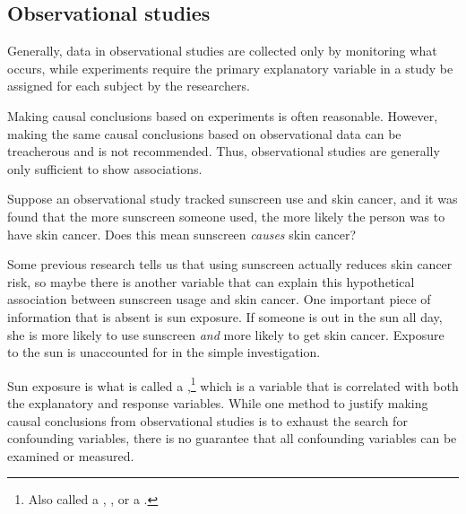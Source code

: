 \subsection{Observational studies}

Generally, data in observational studies are collected only by monitoring what occurs, while experiments require the primary explanatory variable in a study be assigned for each subject by the researchers.

Making causal conclusions based on experiments is often reasonable. However, making the same causal conclusions based on observational data can be treacherous and is not recommended. Thus, observational studies are generally only sufficient to show associations.

\begin{exercisewrap}
\begin{nexercise}\label{sunscreenLurkingExample}%
Suppose an observational study tracked sunscreen use and skin cancer, and it was found that the more sunscreen someone used, the more likely the person was to have skin cancer. Does this mean sunscreen \emph{causes} skin cancer?\footnotemark
\end{nexercise}
\end{exercisewrap}

Some previous research tells us that using sunscreen actually reduces skin cancer risk, so maybe there is another variable that can explain this hypothetical association between sunscreen usage and skin cancer. One important piece of information that is absent is sun exposure. If someone is out in the sun all day, she is more likely to use sunscreen \emph{and} more likely to get skin cancer. Exposure to the sun is unaccounted for in the simple investigation.
\begin{center}
\end{center}

Sun exposure is what is called a ,\footnote{Also called a , , or a .} which is a variable that is correlated with both the explanatory and response variables. While one method to justify making causal conclusions from observational studies is to exhaust the search for confounding variables, there is no guarantee that all confounding variables can be examined or measured.

